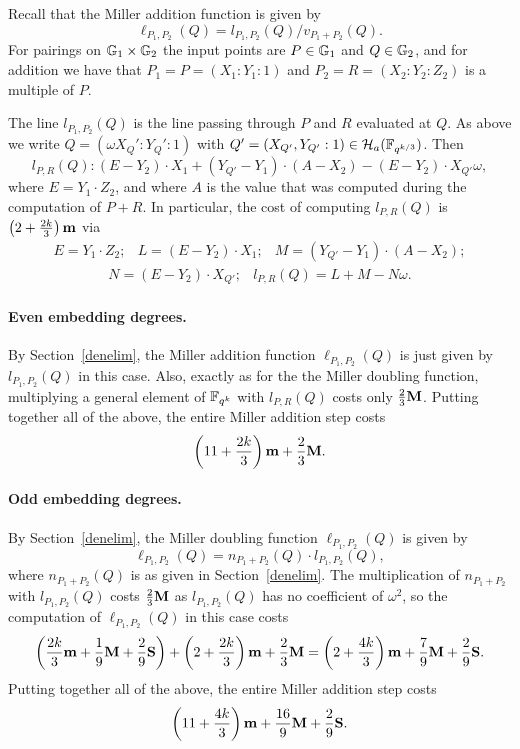 Recall that the Miller addition function is given by
\[\ell_{P_1,P_2}(Q) = l_{P_1,P_2}(Q)/v_{P_1 + P_2}(Q).\]
For pairings on $\mathbb{G}_{1} \times \mathbb{G}_{2}$ the input points are $P \in \mathbb{G}_{1}$ and
$Q \in \mathbb{G}_{2}$, and for addition we have that
 $P_1  = P = (X_1:Y_1:1)$ and $P_2 = R = (X_2:Y_2:Z_2)$ is a multiple of $P$.
 
The line $l_{P_1,P_2}(Q)$ is the line passing through $P$ and $R$ evaluated at $Q$.
As above we write $Q = (\omega X_Q':Y_Q':1)$ with
$Q' = (X_{Q'},Y_{Q'}:1) \in \mathcal{H}_a(\mathbb{F}_{q^{k/3}})$.
Then
$$l_{P,R}(Q): (E - Y_2) \cdot X_1 + (Y_{Q'} - Y_1) \cdot (A - X_2) - (E - Y_2) \cdot X_{Q'}\omega,  $$
where $E = Y_1 \cdot Z_2$, and where $A$ is the value that was computed during the computation of $P+R$.
In particular, the cost of computing $l_{P,R}(Q)$ is $\left(2 + \frac{2k}{3}\right)\textbf{m}$ via
\[\begin{array}{ccc}
E = Y_1 \cdot Z_2; & L = (E-Y_2)\cdot X_1; 
& M = (Y_{Q'} - Y_1) \cdot (A - X_2); 
\end{array}\]
\[\begin{array}{cc}
N = (E - Y_2) \cdot X_{Q'}; &
l_{P,R}(Q) = L + M - N\omega.
\end{array}\]

\paragraph*{Even embedding degrees.}

By Section~\ref{denelim}, the Miller addition function $\ell_{P_1,P_2}(Q)$ is just given by $l_{P_1,P_2}(Q)$ in this case. 
Also, exactly as for the the Miller doubling function, multiplying a general element of $\mathbb{F}_{q^k}$ with $l_{P,R}(Q)$ costs only
$\frac{2}{3}\textbf{M}$.
Putting together all of the above, the entire Miller addition step costs
\[\left(11 + \frac{2k}{3}\right)\textbf{m} + \frac{2}{3}\textbf{M}.\]

\paragraph*{Odd embedding degrees.}

By Section~\ref{denelim}, the Miller doubling function $\ell_{P_1,P_2}(Q)$ is given by
\[\ell_{P_1,P_2}(Q) = n_{P_1+P_2}(Q) \cdot l_{P_1,P_2}(Q),\]
where $n_{P_1+P_2}(Q)$ is as given in Section~\ref{denelim}.
The multiplication of $n_{P_1+P_2}$ with $l_{P_1,P_2}(Q)$ costs
$\frac{2}{3}\textbf{M}$ as $l_{P_1,P_2}(Q)$ has no coefficient of $\omega^2$,
so the computation of $\ell_{P_1,P_2}(Q)$ in this case costs
\[
\left( \frac{2k}{3}\textbf{m} + \frac{1}{9}\textbf{M} + \frac{2}{9}\textbf{S}\right) 
+\left(2 + \frac{2k}{3}\right)\textbf{m} 
+\frac{2}{3}\textbf{M}
=\left(2 + \frac{4k}{3}\right)\textbf{m} + \frac{7}{9}\textbf{M} + \frac{2}{9}\textbf{S}.\]
Putting together all of the above, the entire Miller addition step costs
\[\left(11 + \frac{4k}{3}\right)\textbf{m} + \frac{16}{9}\textbf{M} + \frac{2}{9}\textbf{S}.\]

